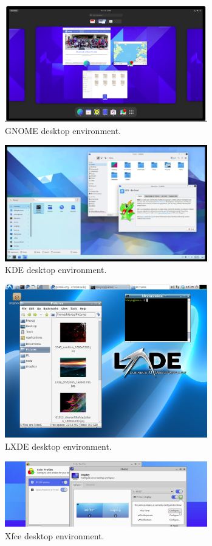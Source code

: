 \begin{figure}
	\centering
	\includegraphics[width=250pt]{chapters/chapter1/figures/gnome_demo.png}
	\caption{GNOME desktop environment.} \label{ch1fig:gnomedemo}
\end{figure}

\begin{figure}
	\centering
	\includegraphics[width=250pt]{chapters/chapter1/figures/kde_demo.png}
	\caption{KDE desktop environment.} \label{ch1fig:kdedemo}
\end{figure}

\begin{figure}
	\centering
	\includegraphics[width=250pt]{chapters/chapter1/figures/lxde_demo.png}
	\caption{LXDE desktop environment.} \label{ch1fig:lxdedemo}
\end{figure}

\begin{figure}
	\centering
	\includegraphics[width=250pt]{chapters/chapter1/figures/xfce_demo.png}
	\caption{Xfce desktop environment.} \label{ch1fig:xfcedemo}
\end{figure}

